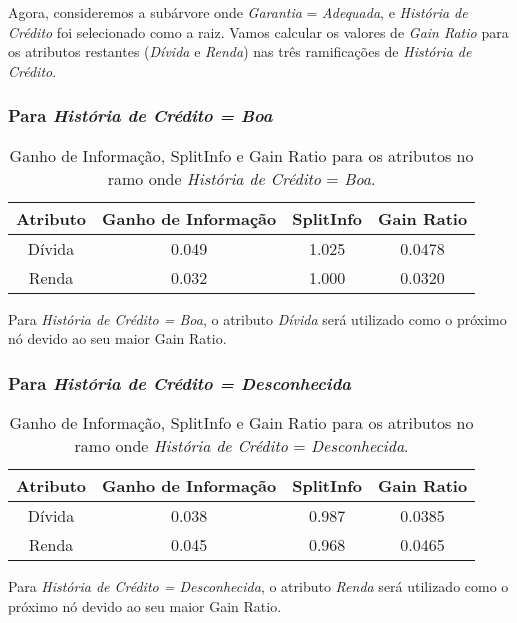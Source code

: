 \documentclass[a4paper,12pt]{article}
\begin{document}
Agora, consideremos a subárvore onde \textit{Garantia} = \textit{Adequada}, e \textit{História de Crédito} foi selecionado como a raiz. Vamos calcular os valores de \textit{Gain Ratio} para os atributos restantes (\textit{Dívida} e \textit{Renda}) nas três ramificações de \textit{História de Crédito}.

\subsubsection{Para \textit{História de Crédito = Boa}}

\begin{table}[H]
\centering
\begin{tabular}{|c|c|c|c|}
\hline
\textbf{Atributo} & \textbf{Ganho de Informação} & \textbf{SplitInfo} & \textbf{Gain Ratio} \\
\hline
Dívida & 0.049 & 1.025 & 0.0478 \\
\hline
Renda & 0.032 & 1.000 & 0.0320 \\
\hline
\end{tabular}
\caption{Ganho de Informação, SplitInfo e Gain Ratio para os atributos no ramo onde \textit{História de Crédito} = \textit{Boa}.}
\label{tab:gain-ratio-hist-boa}
\end{table}

Para \textit{História de Crédito = Boa}, o atributo \textit{Dívida} será utilizado como o próximo nó devido ao seu maior Gain Ratio.

\subsubsection{Para \textit{História de Crédito = Desconhecida}}

\begin{table}[H]
\centering
\begin{tabular}{|c|c|c|c|}
\hline
\textbf{Atributo} & \textbf{Ganho de Informação} & \textbf{SplitInfo} & \textbf{Gain Ratio} \\
\hline
Dívida & 0.038 & 0.987 & 0.0385 \\
\hline
Renda & 0.045 & 0.968 & 0.0465 \\
\hline
\end{tabular}
\caption{Ganho de Informação, SplitInfo e Gain Ratio para os atributos no ramo onde \textit{História de Crédito} = \textit{Desconhecida}.}
\label{tab:gain-ratio-hist-desconhecida}
\end{table}

Para \textit{História de Crédito = Desconhecida}, o atributo \textit{Renda} será utilizado como o próximo nó devido ao seu maior Gain Ratio.
\end{document}
